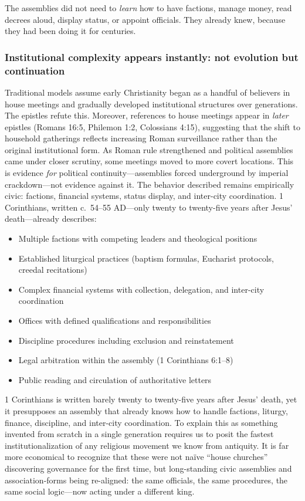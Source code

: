 The assemblies did not need to \emph{learn} how to have factions, manage money, read decrees aloud, display status, or appoint officials.
They already knew, because they had been doing it for centuries.

\subsubsection{Institutional complexity appears instantly: not evolution but continuation}\label{subsubsec:institutional-complexity-appears-instantly-not-evolution-but-continuation}

Traditional models assume early Christianity began as a handful of believers in house meetings and gradually developed institutional structures over generations.
The epistles refute this.
Moreover, references to house meetings appear in \emph{later} epistles (Romans 16:5, Philemon 1:2, Colossians 4:15), suggesting that the shift to household gatherings reflects increasing Roman surveillance rather than the original institutional form.
As Roman rule strengthened and political assemblies came under closer scrutiny, some meetings moved to more covert locations.
This is evidence \emph{for} political continuity---assemblies forced underground by imperial crackdown---not evidence against it.
The behavior described remains empirically civic: factions, financial systems, status display, and inter-city coordination.
1 Corinthians, written c.~54--55 AD---only twenty to twenty-five years after Jesus' death---already describes:
\begin{itemize}
    \item Multiple factions with competing leaders and theological positions
    \item Established liturgical practices (baptism formulas, Eucharist protocols, creedal recitations)
    \item Complex financial systems with collection, delegation, and inter-city coordination
    \item Offices with defined qualifications and responsibilities
    \item Discipline procedures including exclusion and reinstatement
    \item Legal arbitration within the assembly (1 Corinthians 6:1--8)
    \item Public reading and circulation of authoritative letters
\end{itemize}

1 Corinthians is written barely twenty to twenty-five years after Jesus' death, yet it presupposes an assembly that already knows how to handle factions, liturgy, finance, discipline, and inter-city coordination.
To explain this as something invented from scratch in a single generation requires us to posit the fastest institutionalization of any religious movement we know from antiquity.
It is far more economical to recognize that these were not naïve ``house churches'' discovering governance for the first time, but long-standing civic assemblies and association-forms being re-aligned: the same officials, the same procedures, the same social logic---now acting under a different king.

